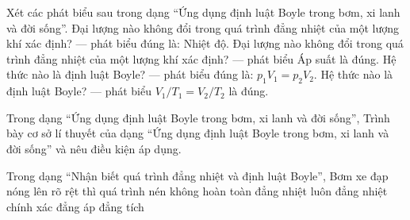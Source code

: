 \begin{ex}
Xét các phát biểu sau trong dạng “Ứng dụng định luật Boyle trong bơm, xi lanh và đời sống”.
\choiceTF
{\True Đại lượng nào không đổi trong quá trình đẳng nhiệt của một lượng khí xác định? — phát biểu đúng là: Nhiệt độ.}
{Đại lượng nào không đổi trong quá trình đẳng nhiệt của một lượng khí xác định? — phát biểu Áp suất là đúng.}
{\True Hệ thức nào là định luật Boyle? — phát biểu đúng là: $p_1V_1=p_2V_2$.}
{Hệ thức nào là định luật Boyle? — phát biểu $V_1/T_1=V_2/T_2$ là đúng.}
\end{ex}

\begin{ex}
Trong dạng “Ứng dụng định luật Boyle trong bơm, xi lanh và đời sống”, Trình bày cơ sở lí thuyết của dạng “Ứng dụng định luật Boyle trong bơm, xi lanh và đời sống” và nêu điều kiện áp dụng.
\choiceTF

\end{ex}

\begin{ex}
Trong dạng “Nhận biết quá trình đẳng nhiệt và định luật Boyle”, Bơm xe đạp nóng lên rõ rệt thì quá trình nén
\choice
{\True không hoàn toàn đẳng nhiệt}
{luôn đẳng nhiệt chính xác}
{đẳng áp}
{đẳng tích}
\end{ex}

